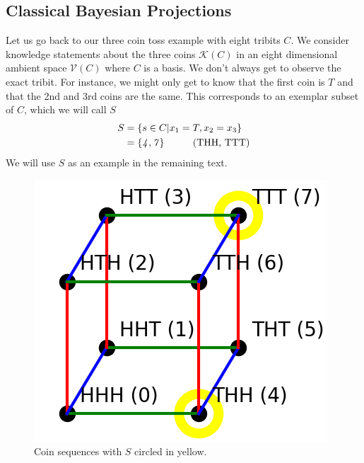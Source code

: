 \documentclass[12pt,a4paper]{article}
\theoremstyle{myrule}
\theoremstyle{postulate}
\theoremstyle{definition}
\begin{document}
\subsection{Classical Bayesian Projections}
\label{proj}
Let us go back to our three coin toss example with eight tribits $C$.   We consider knowledge statements about the three coins $\mathcal{K}(C)$ in an eight dimensional ambient space $\mathcal{V}(C)$ where $C$ is a basis.  We don't always get to observe the exact tribit.  For instance, we might only get to know that the first coin is $T$ and that the 2nd and 3rd coins are the same.  This corresponds to an exemplar subset of $C$, which we will call $S$
\[
\begin{split}
  S &= \{s \in C | x_1 = T, x_2 = x_3 \} \\
    & = \{\mathit{4},\mathit{7}\} \hspace{0.4 in} \text{(THH, TTT)}
\end{split}
\]
We will use $S$ as an example in the remaining text.

\begin{figure}[h]
\centering
\includegraphics[scale=0.6]{cube.png}
\caption{Coin sequences with $S$ circled in yellow.}
\end{figure}
\end{document}
